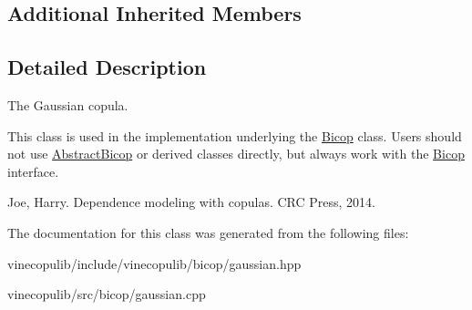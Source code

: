 \subsection*{Additional Inherited Members}


\subsection{Detailed Description}
The Gaussian copula. 

This class is used in the implementation underlying the \hyperlink{classvinecopulib_1_1_bicop}{Bicop} class. Users should not use \hyperlink{classvinecopulib_1_1_abstract_bicop}{Abstract\+Bicop} or derived classes directly, but always work with the \hyperlink{classvinecopulib_1_1_bicop}{Bicop} interface.

Joe, Harry. Dependence modeling with copulas. C\+R\+C Press, 2014. 

The documentation for this class was generated from the following files\+:\begin{DoxyCompactItemize}
\item 
vinecopulib/include/vinecopulib/bicop/gaussian.\+hpp\item 
vinecopulib/src/bicop/gaussian.\+cpp\end{DoxyCompactItemize}
